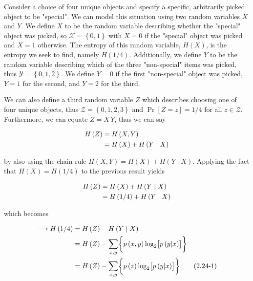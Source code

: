 \documentclass[ClusteringConnectionsMAIN.tex]{subfiles}
\begin{document}
	
  Consider a choice of four unique objects and specify a specific, arbitrarily picked object to be "special".  We can model this situation using two random variables $X$ and $Y$.  We define $X$ to be the random variable describing whether the "special" object was picked, so $\mathcal{X} = \left\{ 0, 1 \right\}$ with $X = 0$ if the "special" object was picked and $X = 1$ otherwise.  The entropy of this random variable, $H \left( X \right)$, is the entropy we seek to find, namely $H \left( 1 / 4 \right)$.  Additionally, we define $Y$ to be the random variable describing which of the three "non-special" items was picked, thus $\mathcal{Y} = \left\{ 0, 1, 2 \right\}$.  We define $Y = 0$ if the first "non-special" object was picked, $Y = 1$ for the second, and $Y = 2$ for the third. \newline

We can also define a third random variable $Z$ which describes choosing one of four unique objects, thus $\mathcal{Z} = \left\{ 0, 1, 2, 3\right\}$ and $\Pr \left[ Z = z \right] = 1 / 4$ for all $z \in \mathcal{Z}$.  Furthermore, we can equate $Z = X \, Y$, thus we can say

\begin{align} 
	H \left( Z \right) &= H \left( X, Y \right) \notag \\
	&= H \left( X \right) + H \left( Y \mid X \right) \notag
\end{align}

by also using the chain rule $H \left( X, Y \right) = H \left( X \right) + H \left( Y \mid X \right)$.  Applying the fact that $H \left( X \right) = H \left( 1 / 4 \right)$ to the previous result yields

\begin{align}
H \left( Z \right) &= H \left( X \right) + H \left( Y \mid X \right) \notag \\
&= H \left( 1/4 \right) + H \left( Y \mid X \right) \notag
\end{align}

which becomes

\begin{align} \label{c2p24eq1}
\longrightarrow H \left( 1/4 \right) &= H \left( Z \right) - H \left( Y \mid X \right) \notag \\
&= H \left( Z \right) - \sum_{x, y} \biggl\{ p \left( x, y \right) \log_2 \bigl[ p \left( y | x \right) \bigr] \biggr\}  \notag \\
&= H \left( Z \right) - \sum_{x, y} \biggl\{ p \left( z \right) \log_2 \bigl[ p \left( y | x \right) \bigr] \biggr\}  \tag{2.24-1}
\end{align}
\end{document}

